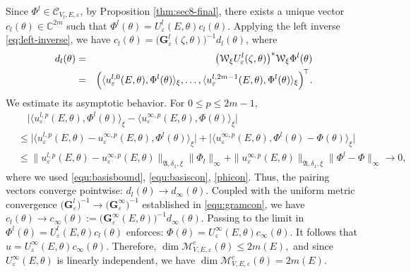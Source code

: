 \documentclass[reqno,11pt]{amsart}
\newcommand{\C}{{\mathbb C}}
\begin{document}
Since $\Phi^{l}\in\mathcal{C}_{V_l,E,\varepsilon}$, by Proposition \ref{thm:sec8-final}, there exists
a unique vector $c_l(\theta)\in\C^{2m}$ such that
$
\Phi^{l}(\theta)= U_\varepsilon^{l}(E,\theta)c_l(\theta). 
$ Applying the left inverse \eqref{eq:left-inverse}, we have
$c_l(\theta)=\bigl(\mathbf G_\varepsilon^l(\zeta,\theta)\bigr)^{-1}d_l(\theta)$,
where 
\begin{eqnarray*}{d}_l(\theta)&=& \bigl(\mathcal{W}_\xi U_\varepsilon^l(\zeta,\theta)\bigr)^* \mathcal{W}_\xi \Phi^{l}(\theta)\\
&=&\Bigl(\langle u^{l,0}_{\varepsilon}(E,\theta),\Phi^{l}(\theta)
\rangle_\xi,\dots,\langle
u^{l,2m-1}_{\varepsilon}(E,\theta),
\Phi^{l}(\theta)\rangle_\xi\Bigr)^{\!\top}.
\end{eqnarray*}
We estimate its asymptotic behavior. For $0\leq p\leq 2m-1$, 
$$\begin{aligned}
   &\quad \big|\langle
u^{l,p}_{\varepsilon}(E,\theta),\Phi^{l}(\theta)\rangle_\xi-
\langle u^{\infty,p}_{\varepsilon}(E,\theta),
\Phi(\theta)\rangle_\xi\big|\\&\leq \big|\langle
u^{l,p}_{\varepsilon}(E,\theta)- u^{\infty,p}_{\varepsilon}(E,\theta),\Phi^{l}(\theta)\rangle_\xi\big|+\big|\langle  u^{\infty,p}_{\varepsilon}(E,\theta),
\Phi^{l}(\theta)-\Phi(\theta)\rangle_\xi\big|\\
&\leq\|u^{l,p}_{\varepsilon}(E,\theta)- u^{\infty,p}_{\varepsilon}(E,\theta)\|_{\mathfrak A,\delta_1,\xi}\|\Phi_l\|_\infty+\|u^{\infty,p}_{\varepsilon}(E,\theta)\|_{\mathfrak A,\delta_1,\xi}\|\Phi^{l}-
\Phi\|_\infty \rightarrow 0,
\end{aligned}$$
where we used \eqref{equ:basisbound}, \eqref{equ:basiscon}, \eqref{phicon}.
Thus, the pairing vectors converge pointwise: $d_l(\theta) \to d_\infty(\theta) $.
Coupled with the uniform metric convergence $\bigl(\mathbf{G}_\varepsilon^l\bigr)^{-1} \to \bigl(\mathbf{G}_\varepsilon^\infty\bigr)^{-1}$ established in \eqref{equ:gramcon}, we have
$
c_l(\theta) \to c_\infty(\theta) := \bigl(\mathbf{G}_\varepsilon^\infty(E,\theta)\bigr)^{-1} d_\infty(\theta).
$
Passing to the limit in  $\Phi^l(\theta) = U_\varepsilon^l(E,\theta) c_l(\theta)$ enforces:
$
\Phi(\theta) = U_\varepsilon^\infty(E,\theta) c_\infty(\theta).
$
It follows that $u = U_\varepsilon^\infty(E,\theta) c_\infty(\theta)$. Therefore, $\dim{{\mathcal{M}_{V,E,\varepsilon}^c(\theta)}}\leq 2m(E),$ and since $U_\varepsilon^{\infty}(E,\theta)$ is linearly independent, we have $\dim{{\mathcal{M}_{V,E,\varepsilon}^c(\theta)}}= 2m(E).$ 
\end{document}
